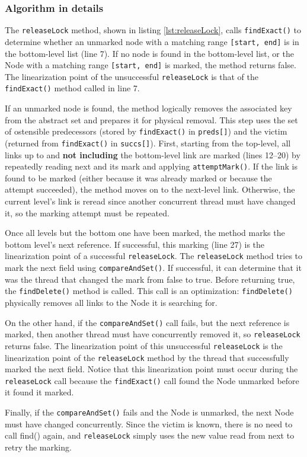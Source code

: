 \subsubsection*{Algorithm in details}

The \texttt{releaseLock} method, shown in listing \ref{lst:releaseLock}, calls \texttt{findExact()} to determine whether an unmarked node with a matching range \texttt{[start, end]} is in the bottom-level list (line 7). 
If no node is found in the bottom-level list, or the Node with a matching range \texttt{[start, end]} is marked, the method returns false. 
The linearization point of the unsuccessful \texttt{releaseLock} is that of the \texttt{findExact()} method called in line 7. 

If an unmarked node is found, the method logically removes the associated key from the abstract set and prepares it for physical removal. 
This step uses the set of ostensible predecessors (stored by \texttt{findExact()} in \texttt{preds[]}) and the victim (returned from \texttt{findExact()} in \texttt{succs[]}). 
First, starting from the top-level, all links up to and \textbf{not including} the bottom-level link are marked (lines 12--20) by repeatedly reading next and its mark and applying \texttt{attemptMark()}. 
If the link is found to be marked (either because it was already marked or because the attempt succeeded), the method moves on to the next-level link. 
Otherwise, the current level's link is reread since another concurrent thread must have changed it, so the marking attempt must be repeated. 

Once all levels but the bottom one have been marked, the method marks the bottom level's next reference. 
If successful, this marking (line 27) is the linearization point of a successful \texttt{releaseLock}. The \texttt{releaseLock} method tries to mark the next field using \texttt{compareAndSet()}. 
If successful, it can determine that it was the thread that changed the mark from false to true. Before returning true, the \texttt{findDelete()} method is called. This call is an optimization: \texttt{findDelete()} physically removes all links to the Node it is searching for.

On the other hand, if the  \texttt{compareAndSet()} call fails, but the next reference is marked, then another thread must have concurrently removed it, so \texttt{releaseLock} returns false. 
The linearization point of this unsuccessful \texttt{releaseLock} is the linearization point of the \texttt{releaseLock} method by the thread that successfully marked the next field. 
Notice that this linearization point must occur during the \texttt{releaseLock} call because the \texttt{findExact()} call found the Node unmarked before it found it marked.

Finally, if the \texttt{compareAndSet()} fails and the Node is unmarked, the next Node must have changed concurrently. 
Since the victim is known, there is no need to call find() again, and \texttt{releaseLock} simply uses the new value read from next to retry the marking.